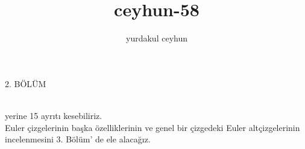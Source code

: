 \documentclass[11pt]{amsbook}
\title{ceyhun-58}
\author{yurdakul ceyhun}
\begin{document}

2. BÖLÜM\\
\hline\\
\vspace{1cm}

yerine 15 ayrıtı kesebiliriz.\\

Euler çizgelerinin başka özelliklerinin ve genel bir
çizgedeki Euler altçizgelerinin incelenmesini 3.
Bölüm' de ele alacağız.
\end{document}
